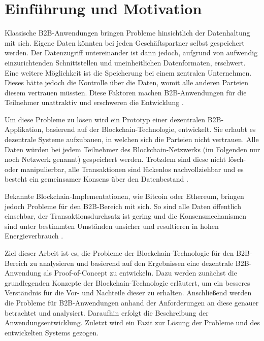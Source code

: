\chapter{Einführung und Motivation}
\label{cha:einfuehrung}

Klassische B2B-Anwendungen bringen Probleme hinsichtlich der Datenhaltung mit sich. Eigene Daten könnten bei jeden Geschäftspartner selbst gespeichert werden. Der Datenzugriff untereinander ist dann jedoch, aufgrund von aufwendig einzurichtenden Schnittstellen und uneinheitlichen Datenformaten, erschwert. Eine weitere Möglichkeit ist die Speicherung bei einem zentralen Unternehmen. Dieses hätte jedoch die Kontrolle über die Daten, womit alle anderen Parteien diesem vertrauen müssten. Diese Faktoren machen B2B-Anwendungen für die Teilnehmer unattraktiv und erschweren die Entwicklung \cite{KorpelaDigitalSupplyChain2017}\cite{WustyouneedBlockchain2017}.

Um diese Probleme zu lösen wird ein Prototyp einer dezentralen B2B-Applikation, basierend auf der Blockchain-Technologie, entwickelt. Sie erlaubt es dezentrale Systeme aufzubauen, in welchen sich die Parteien nicht vertrauen. Alle Daten würden bei jedem Teilnehmer des Blockchain-Netzwerks (im Folgenden nur noch Netzwerk genannt) gespeichert werden. Trotzdem sind diese nicht lösch- oder manipulierbar, alle Transaktionen sind lückenlos nachvollziehbar und es besteht ein gemeinsamer Konsens über den Datenbestand \cite{CrosbyBlockChainTechnologyBitcoin2016}.

Bekannte Blockchain-Implementationen, wie Bitcoin oder Ethereum, bringen jedoch Probleme für den B2B-Bereich mit sich. So sind alle Daten öffentlich einsehbar, der Transaktionsdurchsatz ist gering und die Konsensmechanismen sind unter bestimmten Umständen unsicher und resultieren in hohen Energieverbrauch \cite{Gramolidangerprivateblockchains2016}\cite{NakamotoBitcoinPeertoPeerElectronic2008}\cite{EthereumTeamEthereumWhitePaper2017}. 

Ziel dieser Arbeit ist es, die Probleme der Blockchain-Technologie für den B2B-Bereich zu analysieren und basierend auf den Ergebnissen eine dezentrale B2B-Anwendung als Proof-of-Concept zu entwickeln. Dazu werden zunächst die grundlegenden Konzepte der Blockchain-Technologie erläutert, um ein besseres Verständnis für die Vor- und Nachteile dieser zu erhalten. Anschließend werden die Probleme für B2B-Anwendungen anhand der Anforderungen an diese genauer betrachtet und analysiert. Daraufhin erfolgt die Beschreibung der Anwendungsentwicklung. Zuletzt wird ein Fazit zur Lösung der Probleme und des entwickelten Systems gezogen.
